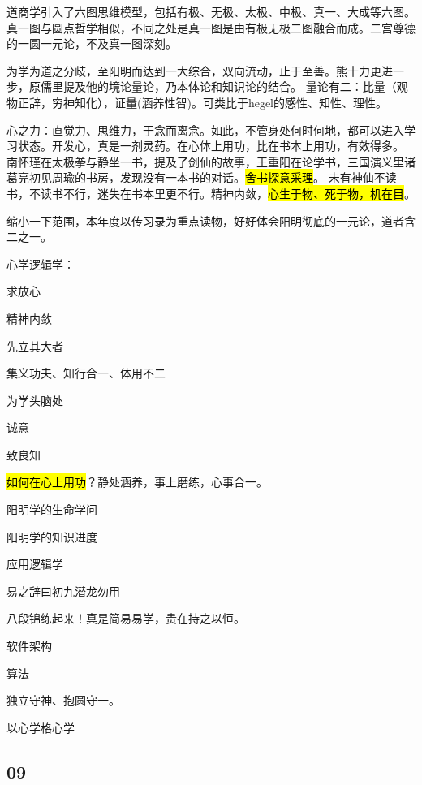 道商学引入了六图思维模型，包括有极、无极、太极、中极、真一、大成等六图。
真一图与圆点哲学相似，不同之处是真一图是由有极无极二图融合而成。二宫尊德的一圆一元论，不及真一图深刻。

为学为道之分歧，至阳明而达到一大综合，双向流动，止于至善。熊十力更进一步，原儒里提及他的境论量论，乃本体论和知识论的结合。
量论有二：比量（观物正辞，穷神知化），证量(涵养性智)。可类比于hegel的感性、知性、理性。

心之力：直觉力、思维力，于念而离念。如此，不管身处何时何地，都可以进入学习状态。开发心，真是一剂灵药。在心体上用功，比在书本上用功，有效得多。
南怀瑾在太极拳与静坐一书，提及了剑仙的故事，王重阳在论学书，三国演义里诸葛亮初见周瑜的书房，发现没有一本书的对话。\hl{舍书探意采理}。
未有神仙不读书，不读书不行，迷失在书本里更不行。精神内敛，\hl{心生于物、死于物，机在目}。

缩小一下范围，本年度以传习录为重点读物，好好体会阳明彻底的一元论，道者含二之一。

心学逻辑学：
\begin{enumbox}
\item 求放心
\item 精神内敛
\item 先立其大者
\item 集义功夫、知行合一、体用不二
\item *
\item 为学头脑处
\item 诚意
\item 致良知
\item \hl{如何在心上用功}？静处涵养，事上磨练，心事合一。
\item *
\item 阳明学的生命学问
\item 阳明学的知识进度
\end{enumbox}

应用逻辑学
\begin{enumbox}
\item 易之辞曰初九潜龙勿用
\item 八段锦练起来！真是简易易学，贵在持之以恒。
\item 软件架构
\item 算法
\end{enumbox}

独立守神、抱圆守一。

以心学格心学

\subsection{09}

